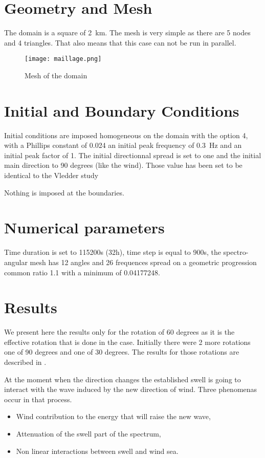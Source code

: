 \section{Geometry and Mesh}
%
The domain is a square of 2~km.
The mesh is very simple as there are 5 nodes and 4 triangles. That also means that this case can not be run in parallel.
\begin{figure} [!h]
\centering
\texttt{[image: maillage.png]}
 \caption{Mesh of the domain}
\label{mailTW}
\end{figure}
%
%
\section{Initial and Boundary Conditions}
%
Initial conditions are imposed homogeneous on the domain with the option 4, with a Phillips constant of 0.024 an initial peak frequency of 0.3~Hz  and an initial peak factor of 1.  The initial directionnal spread is set to one and the initial main direction to 90 degrees (like the wind).
Those value has been set to be identical to the Vledder study \cite{Vanvledder1990}

Nothing is imposed at the boundaries.
%
%
\section{Numerical parameters}
Time duration is set to 115200s (32h), time step is equal to 900s, the spectro-angular mesh has 12 angles and 26 frequences spread on a geometric progression common ratio 1.1 with a minimum of 0.04177248.

%
%
\section{Results}
%
We present here the results only for the rotation of 60 degrees as it is the effective rotation that is done in the case. Initially there were 2 more rotations one of 90 degrees and one of 30 degrees. The results for those rotations are described in \cite{Benoit1996_2}.

At the moment when the direction changes the established swell is going to interact with the wave induced by the new direction of wind. Three phenomenas occur in that process.
\begin {itemize}
\item Wind contribution to the energy that will raise the new wave,
\item Attenuation of the swell part of the spectrum,
\item Non linear interactions between swell and wind sea.
\end{itemize}

